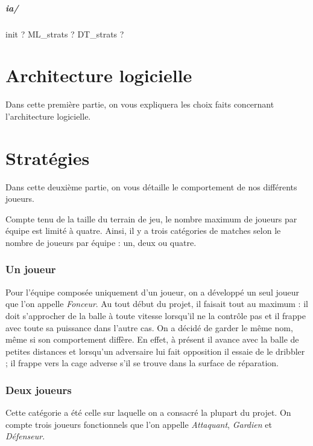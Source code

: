 \documentclass[12pt,a4paper]{article}
\begin{document}
\subsubsection*{ia/}
init ? ML\_strats ? DT\_strats ? 

\newpage

\part{Architecture logicielle} %
Dans cette premi\`ere partie, on vous expliquera les choix faits 
concernant l'architecture logicielle.

\newpage

\part{Strat\'egies}
Dans cette deuxi\`eme partie, on vous d\'etaille le comportement de nos 
diff\'erents joueurs.

Compte tenu de la taille du terrain de jeu, le nombre maximum de joueurs par 
\'equipe est limit\'e \`a quatre. Ainsi, il y a trois cat\'egories de matches 
selon le nombre de joueurs par \'equipe : un, deux ou quatre.

\section*{Un joueur}
Pour l'\'equipe compos\'ee uniquement d'un joueur, on a d\'evelopp\'e un seul 
joueur que l'on appelle {\itshape Fonceur}. Au tout d\'ebut du 
projet, il faisait tout au maximum : il doit 
s'approcher de la balle \`a toute vitesse lorsqu'il ne la contr\^ole pas et il 
frappe avec toute sa puissance dans l'autre cas. On a d\'ecid\'e de garder le 
m\^eme nom, m\^eme si son comportement diff\`ere. En effet, \`a pr\'esent il 
avance avec la balle de petites distances et lorsqu'un adversaire lui fait 
opposition il essaie de le dribbler ; il frappe vers la cage adverse s'il se 
trouve dans la surface de r\'eparation. 

\section*{Deux joueurs}
Cette cat\'egorie a \'et\'e celle sur laquelle on a consacr\'e la plupart du 
projet. On compte trois joueurs fonctionnels que l'on appelle 
{\itshape Attaquant}, {\itshape Gardien} et {\itshape D\'efenseur}. 
\end{document}
